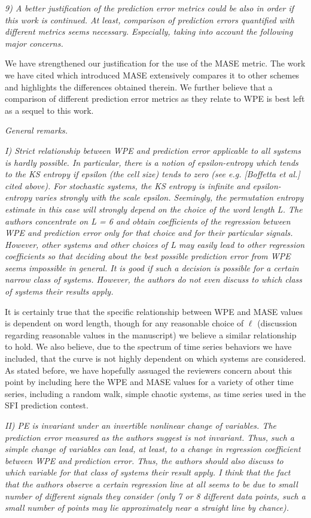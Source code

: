 \documentclass[12pt]{article}
\begin{document}
\emph{9) A better justification of the prediction error metrics could be also in
order if this work is continued. At least, comparison of prediction errors
quantified with different metrics seems necessary. Especially, taking into
account the following major concerns.}

We have strengthened our justification for the use of the MASE metric. The work
we have cited which introduced MASE extensively compares it to other schemes and
highlights the differences obtained therein. We further believe that a
comparison of different prediction error metrics as they relate to WPE is best
left as a sequel to this work.

\noindent\emph{General remarks.}

\emph{I) Strict relationship between WPE and prediction error applicable to all
systems is hardly possible. In particular, there is a notion of epsilon-entropy
which tends to the KS entropy if epsilon (the cell size) tends to zero (see e.g.
[Boffetta et al.] cited above). For stochastic systems, the KS entropy is
infinite and epsilon-entropy varies strongly with the scale epsilon. Seemingly,
the permutation entropy estimate in this case will strongly depend on the choice
of the word length L. The authors concentrate on L = 6 and obtain coefficients
of the regression between WPE and prediction error only for that choice and for
their particular signals. However, other systems and other choices of L may
easily lead to other regression coefficients so that deciding about the best
possible prediction error from WPE seems impossible in general. It is good if
such a decision is possible for a certain narrow class of systems. However, the
authors do not even discuss to which class of systems their results apply.}

It is certainly true that the specific relationship between WPE and MASE values
is dependent on word length, though for any reasonable choice of $\ell$
(discussion regarding reasonable values in the manuscript) we believe a similar
relationship to hold. We also believe, due to the spectrum of time series
behaviors we have included, that the curve is not highly dependent on which
systems are considered. As stated before, we have hopefully assuaged the
reviewers concern about this point by including here the WPE and MASE values for
a variety of other time series, including a random walk, simple chaotic systems,
as time series used in the SFI prediction contest.

\emph{II) PE is invariant under an invertible nonlinear change of variables. The
prediction error measured as the authors suggest is not invariant. Thus, such a
simple change of variables can lead, at least, to a change in regression
coefficient between WPE and prediction error. Thus, the authors should also
discuss to which variable for that class of systems their result apply. I think
that the fact that the authors observe a certain regression line at all seems to
be due to small number of different signals they consider (only 7 or 8 different
data points, such a small number of points may lie approximately near a straight
line by chance).}
\end{document}
